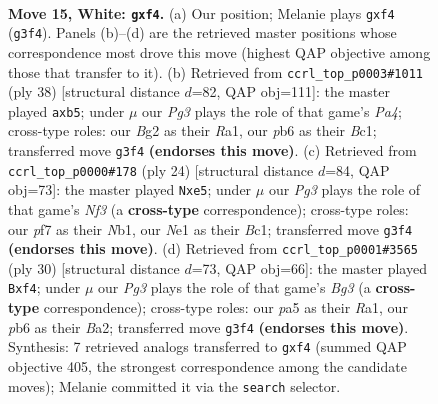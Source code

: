 \documentclass[11pt]{article}
\begin{document}
\begin{figure}[p]\centering
\begin{subfigure}{0.46\textwidth}\centering
\resizebox{\linewidth}{!}{%
\newchessgame
\chessboard[
  setfen={r1b1qr1k/5pb1/1pnp1np1/p1p4p/2P1Pp1P/BPN3P1/P2P2B1/1R1QNRK1 w - - 0 15},
  showmover=false,
  pgfstyle=straightmove, color=movearrow, markmove={g3-f4}
]}
\caption{}
\end{subfigure}\hfill
\begin{subfigure}{0.46\textwidth}\centering
\resizebox{\linewidth}{!}{%
\newchessgame
\chessboard[
  setfen={r3r1k1/1bq1bp2/p2pn1p1/1p2p2p/P3P1nP/1NNQ2P1/1PP2PB1/R1BR2K1 w - - 0 20},
  showmover=false,
  pgfstyle=straightmove, color=movearrow, markmove={a4-b5}
]}
\caption{}
\end{subfigure}
\\[4pt]
\begin{subfigure}{0.46\textwidth}\centering
\resizebox{\linewidth}{!}{%
\newchessgame
\chessboard[
  setfen={r2q1rk1/3bppbp/p4np1/npp1p3/P7/2PP1N1P/BP3PP1/RNBQR1K1 w - - 0 13},
  showmover=false,
  pgfstyle=straightmove, color=movearrow, markmove={f3-e5}
]}
\caption{}
\end{subfigure}\hfill
\begin{subfigure}{0.46\textwidth}\centering
\resizebox{\linewidth}{!}{%
\newchessgame
\chessboard[
  setfen={r2q1r2/3bbppk/p2p1n1p/npp5/P3Pp1N/2PP2B1/BP1NQ1PP/R4RK1 w - - 0 16},
  showmover=false,
  pgfstyle=straightmove, color=movearrow, markmove={g3-f4}
]}
\caption{}
\end{subfigure}
\caption{\textbf{Move 15, White: \texttt{gxf4}.} (a) Our position; Melanie plays \texttt{gxf4} (\texttt{g3f4}). Panels (b)--(d) are the retrieved master positions whose correspondence most drove this move (highest QAP objective among those that transfer to it). (b) Retrieved from \texttt{ccrl\_top\_p0003\#1011} (ply 38) [structural distance $d$=82, QAP obj=111]: the master played \texttt{axb5}; under $\mu$ our \emph{Pg3} plays the role of that game's \emph{Pa4}; cross-type roles: our \emph{B}g2 as their \emph{R}a1, our \emph{p}b6 as their \emph{B}c1; transferred move \texttt{g3f4} \textbf{(endorses this move)}. (c) Retrieved from \texttt{ccrl\_top\_p0000\#178} (ply 24) [structural distance $d$=84, QAP obj=73]: the master played \texttt{Nxe5}; under $\mu$ our \emph{Pg3} plays the role of that game's \emph{Nf3} (a \textbf{cross-type} correspondence); cross-type roles: our \emph{p}f7 as their \emph{N}b1, our \emph{N}e1 as their \emph{B}c1; transferred move \texttt{g3f4} \textbf{(endorses this move)}. (d) Retrieved from \texttt{ccrl\_top\_p0001\#3565} (ply 30) [structural distance $d$=73, QAP obj=66]: the master played \texttt{Bxf4}; under $\mu$ our \emph{Pg3} plays the role of that game's \emph{Bg3} (a \textbf{cross-type} correspondence); cross-type roles: our \emph{p}a5 as their \emph{R}a1, our \emph{p}b6 as their \emph{B}a2; transferred move \texttt{g3f4} \textbf{(endorses this move)}. Synthesis: 7 retrieved analogs transferred to \texttt{gxf4} (summed QAP objective 405, the strongest correspondence among the candidate moves); Melanie committed it via the \texttt{search} selector.}
\label{fig:thought-m28}
\end{figure}
\end{document}

